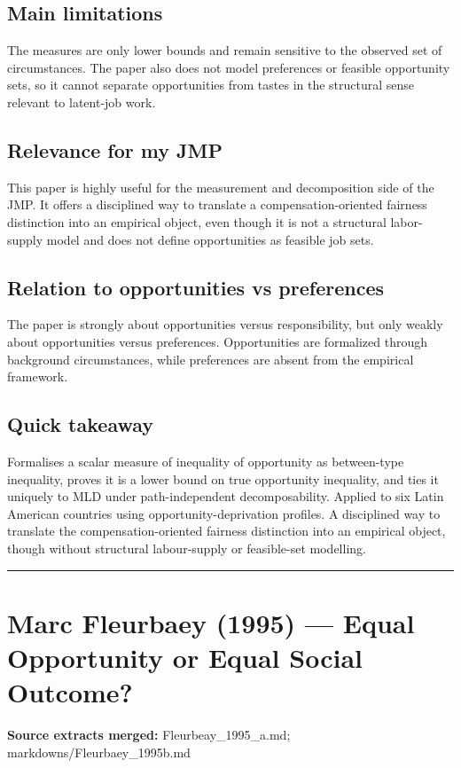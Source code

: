 \documentclass[11pt,a4paper]{article}
\begin{document}
\subsection*{Main limitations}
The measures are only lower bounds and remain sensitive to the observed set of circumstances. The paper also does not model preferences or feasible opportunity sets, so it cannot separate opportunities from tastes in the structural sense relevant to latent-job work.

\subsection*{Relevance for my JMP}
This paper is highly useful for the measurement and decomposition side of the JMP. It offers a disciplined way to translate a compensation-oriented fairness distinction into an empirical object, even though it is not a structural labor-supply model and does not define opportunities as feasible job sets.

\subsection*{Relation to opportunities vs preferences}
The paper is strongly about opportunities versus responsibility, but only weakly about opportunities versus preferences. Opportunities are formalized through background circumstances, while preferences are absent from the empirical framework.

\subsection*{Quick takeaway}
Formalises a scalar measure of inequality of opportunity as between-type inequality, proves it is a lower bound on true opportunity inequality, and ties it uniquely to MLD under path-independent decomposability. Applied to six Latin American countries using opportunity-deprivation profiles. A disciplined way to translate the compensation-oriented fairness distinction into an empirical object, though without structural labour-supply or feasible-set modelling.

\medskip\hrule\medskip

\section*{Marc Fleurbaey (1995) — Equal Opportunity or Equal Social Outcome?}

\textbf{Source extracts merged:} Fleurbeay\_1995\_a.md; markdowns/Fleurbaey\_1995b.md
\end{document}
